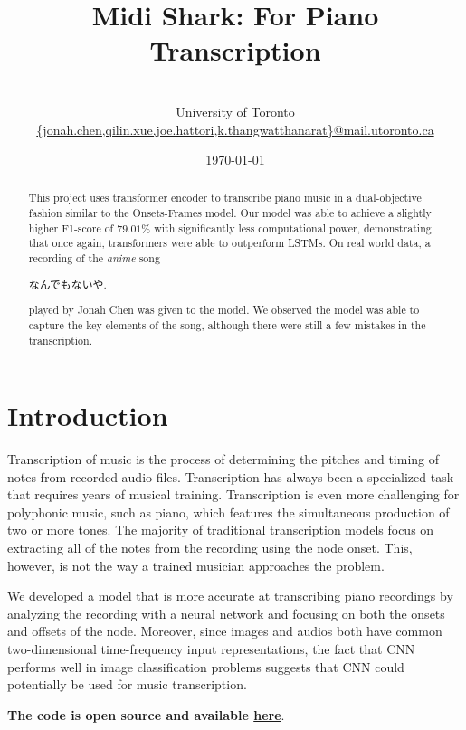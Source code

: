 \documentclass[a4paper,twocolumn,10pt]{article}
\title{\vspace{-50pt}\bfseries{\Large{Midi Shark: For Piano Transcription}}}
\author{\normalfont{Jonah Chen, QiLin Xue, Joe Hattori, Khanatat Thangwatthanarat}\\\small{University of Toronto}\\\vspace{-10pt}\small{\url{{jonah.chen,qilin.xue,joe.hattori,k.thangwatthanarat}@mail.utoronto.ca}}}
\date{\today}
\begin{document}
\maketitle
\begin{abstract}
  This project uses transformer encoder to transcribe piano music in a dual-objective fashion similar to the Onsets-Frames model\cite{onsets_and_frames}. Our model was able to achieve a slightly higher F1-score of \(79.01\%\) with significantly less computational power, demonstrating that once again, transformers were able to outperform LSTMs. On real world data, a recording of the \textit{anime} song \begin{CJK}{UTF8}{min}なんでもないや.\end{CJK} played by Jonah Chen was given to the model. We observed the model was able to capture the key elements of the song, although there were still a few mistakes in the transcription.
\end{abstract}
\section{Introduction}
Transcription of music is the process of determining the pitches and timing of notes from recorded audio files. Transcription has always been a specialized task that requires years of musical training. Transcription is even more challenging for polyphonic music, such as piano, which features the simultaneous production of two or more tones. The majority of traditional transcription models focus on extracting all of the notes from the recording using the node onset. This, however, is not the way a trained musician approaches the problem\cite{intro}.

We developed a model that is more accurate at transcribing piano recordings by analyzing the recording with a neural network and focusing on both the onsets and offsets of the node. Moreover, since images and audios both have common two-dimensional time-frequency input representations, the fact that CNN performs well in image classification problems suggests that CNN could potentially be used for music transcription\cite{onsets_and_frames}.

\textbf{The code is open source and available \href{https://github.com/jonah-chen/midi-shark/}{here}}.
\end{document}
